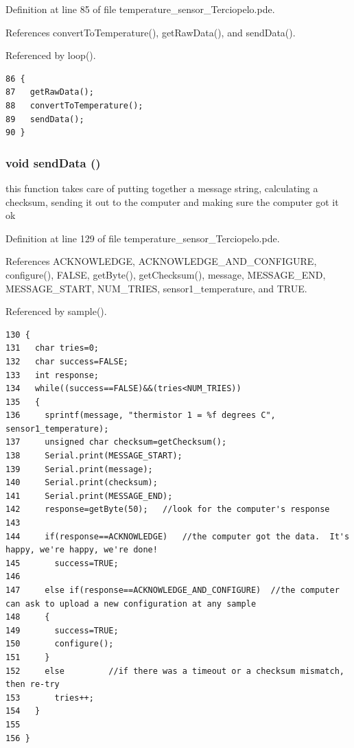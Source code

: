 Definition at line 85 of file temperature\_\-sensor\_\-Terciopelo.pde.

References convertToTemperature(), getRawData(), and sendData().

Referenced by loop().

\begin{Code}\begin{verbatim}86 {
87   getRawData();
88   convertToTemperature();
89   sendData();
90 }
\end{verbatim}
\end{Code}


\hypertarget{temperature__sensor___terciopelo_8pde_95b1b253ee46df6a93285803cf1f3370}{
\subsubsection[{sendData}]{\setlength{\rightskip}{0pt plus 5cm}void sendData ()}}
\label{temperature__sensor___terciopelo_8pde_95b1b253ee46df6a93285803cf1f3370}


this function takes care of putting together a message string, calculating a checksum, sending it out to the computer and making sure the computer got it ok 



Definition at line 129 of file temperature\_\-sensor\_\-Terciopelo.pde.

References ACKNOWLEDGE, ACKNOWLEDGE\_\-AND\_\-CONFIGURE, configure(), FALSE, getByte(), getChecksum(), message, MESSAGE\_\-END, MESSAGE\_\-START, NUM\_\-TRIES, sensor1\_\-temperature, and TRUE.

Referenced by sample().

\begin{Code}\begin{verbatim}130 {
131   char tries=0;
132   char success=FALSE;
133   int response;
134   while((success==FALSE)&&(tries<NUM_TRIES))
135   {
136     sprintf(message, "thermistor 1 = %f degrees C", sensor1_temperature);
137     unsigned char checksum=getChecksum();
138     Serial.print(MESSAGE_START);
139     Serial.print(message);
140     Serial.print(checksum);
141     Serial.print(MESSAGE_END);
142     response=getByte(50);   //look for the computer's response
143     
144     if(response==ACKNOWLEDGE)   //the computer got the data.  It's happy, we're happy, we're done!
145       success=TRUE;
146     
147     else if(response==ACKNOWLEDGE_AND_CONFIGURE)  //the computer can ask to upload a new configuration at any sample
148     {
149       success=TRUE;
150       configure();
151     }
152     else         //if there was a timeout or a checksum mismatch, then re-try
153       tries++;
154   }
155     
156 }
\end{verbatim}
\end{Code}


